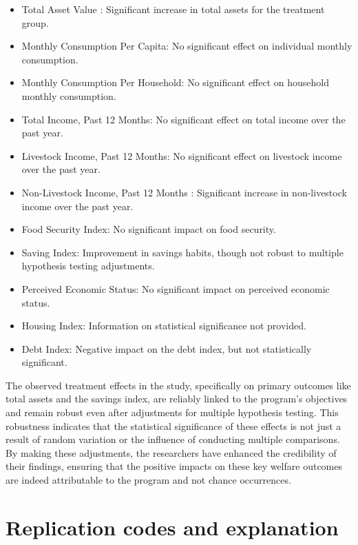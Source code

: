 \documentclass{article}
\begin{document}
\begin{itemize}
 
    \item Total Asset Value : Significant increase in total assets for the treatment group.
    \item Monthly Consumption Per Capita: No significant effect on individual monthly consumption.
    \item Monthly Consumption Per Household: No significant effect on household monthly consumption.
    \item Total Income, Past 12 Months: No significant effect on total income over the past year.
    \item Livestock Income, Past 12 Months: No significant effect on livestock income over the past year.
    \item Non-Livestock Income, Past 12 Months : Significant increase in non-livestock income over the past year.
    \item Food Security Index: No significant impact on food security.
    \item Saving Index: Improvement in savings habits, though not robust to multiple hypothesis testing adjustments.
    \item Perceived Economic Status: No significant impact on perceived economic status.
    \item Housing Index: Information on statistical significance not provided.
    \item Debt Index: Negative impact on the debt index, but not statistically significant.

\end{itemize}

The observed treatment effects in the study, specifically on primary outcomes like total assets and the savings index, are reliably linked to the program's objectives and remain robust even after adjustments for multiple hypothesis testing. This robustness indicates that the statistical significance of these effects is not just a result of random variation or the influence of conducting multiple comparisons. By making these adjustments, the researchers have enhanced the credibility of their findings, ensuring that the positive impacts on these key welfare outcomes are indeed attributable to the program and not chance occurrences.


\section{Replication codes and explanation}
\end{document}
